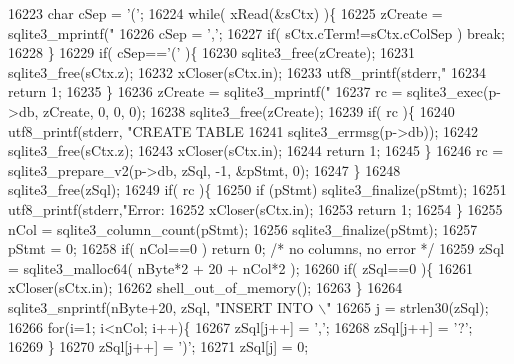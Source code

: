 \begin{DoxyCode}
{{{{{{{{{{{{{{{{{{{{{{{{{{16223       \textcolor{keywordtype}{char} cSep = \textcolor{charliteral}{'('};
16224       \textcolor{keywordflow}{while}( xRead(&sCtx) )\{
16225         zCreate = sqlite3_mprintf(\textcolor{stringliteral}{"%
16226         cSep = \textcolor{charliteral}{','};
16227         \textcolor{keywordflow}{if}( sCtx.cTerm!=sCtx.cColSep ) \textcolor{keywordflow}{break};
16228       \}
16229       \textcolor{keywordflow}{if}( cSep==\textcolor{charliteral}{'('} )\{
16230         sqlite3_free(zCreate);
16231         sqlite3_free(sCtx.z);
16232         xCloser(sCtx.in);
16233         utf8_printf(stderr,\textcolor{stringliteral}{"%
16234         \textcolor{keywordflow}{return} 1;
16235       \}
16236       zCreate = sqlite3_mprintf(\textcolor{stringliteral}{"%
16237       rc = sqlite3_exec(p->db, zCreate, 0, 0, 0);
16238       sqlite3_free(zCreate);
16239       \textcolor{keywordflow}{if}( rc )\{
16240         utf8_printf(stderr, \textcolor{stringliteral}{"CREATE TABLE %
16241                 sqlite3_errmsg(p->db));
16242         sqlite3_free(sCtx.z);
16243         xCloser(sCtx.in);
16244         \textcolor{keywordflow}{return} 1;
16245       \}
16246       rc = sqlite3_prepare_v2(p->db, zSql, -1, &pStmt, 0);
16247     \}
16248     sqlite3_free(zSql);
16249     \textcolor{keywordflow}{if}( rc )\{
16250       \textcolor{keywordflow}{if} (pStmt) sqlite3_finalize(pStmt);
16251       utf8_printf(stderr,\textcolor{stringliteral}{"Error: %
16252       xCloser(sCtx.in);
16253       \textcolor{keywordflow}{return} 1;
16254     \}
16255     nCol = sqlite3_column_count(pStmt);
16256     sqlite3_finalize(pStmt);
16257     pStmt = 0;
16258     \textcolor{keywordflow}{if}( nCol==0 ) \textcolor{keywordflow}{return} 0; \textcolor{comment}{/* no columns, no error */}
16259     zSql = sqlite3_malloc64( nByte*2 + 20 + nCol*2 );
16260     \textcolor{keywordflow}{if}( zSql==0 )\{
16261       xCloser(sCtx.in);
16262       shell_out_of_memory();
16263     \}
16264     sqlite3_snprintf(nByte+20, zSql, \textcolor{stringliteral}{"INSERT INTO \(\backslash\)"%
16265     j = strlen30(zSql);
16266     \textcolor{keywordflow}{for}(i=1; i<nCol; i++)\{
16267       zSql[j++] = \textcolor{charliteral}{','};
16268       zSql[j++] = \textcolor{charliteral}{'?'};
16269     \}
16270     zSql[j++] = \textcolor{charliteral}{')'};
16271     zSql[j] = 0;
}}}}}}}}}}}}}}}}}}}}}}}}}}}}}}}}
\end{DoxyCode}
